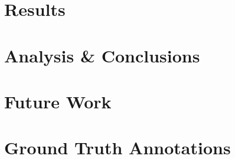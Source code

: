 \documentclass{uvamscse}	%
\begin{document}



\chapter{Results}
\label{results}




\chapter{Analysis \& Conclusions}




\chapter{Future Work}




\printbibliography

\appendix
{}


%


\chapter{Ground Truth Annotations}
\label{groundtruth}



\end{document}
